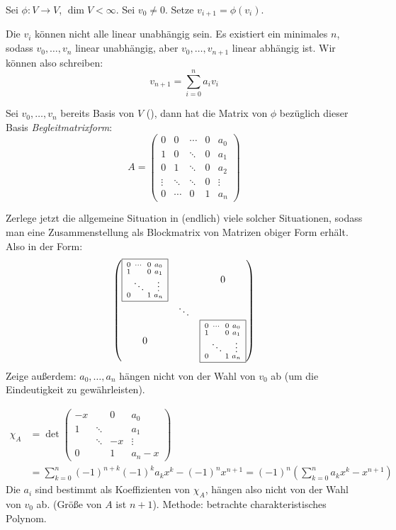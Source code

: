 \documentclass[a4paper, 10pt]{scrbook}
\begin{document}
\begin{ex}
Sei $\phi:V\to V$, $\dim V<\infty$.
Sei $v_0\neq 0$.
Setze $v_{i+1}=\phi(v_i)$.

Die $v_i$ können nicht alle linear unabhängig sein.
Es existiert ein minimales $n$, sodass $v_0,\dotsc,v_n$ linear unabhängig, aber $v_0,\dotsc,v_{n+1}$ linear abhängig ist.
Wir können also schreiben:
\[
v_{n+1} = \sum_{i=0}^n a_iv_i
\]

Sei $v_0,\dotsc,v_n$ bereits Basis von $V$ (\fixme[Verwirrend, denn $\dim V=n+1$]), dann hat die Matrix von $\phi$ bezüglich dieser Basis \emph{Begleitmatrixform}:
\[
A= \begin{pmatrix}
0 & 0 & \cdots & 0 & a_0\\
1 & 0 & \ddots & 0 & a_1\\
0 & 1 & \ddots & 0 & a_2\\
\vdots & \ddots & \ddots & 0 & \vdots\\
0 & \cdots & 0 & 1 & a_n
\end{pmatrix}
\]

Zerlege jetzt die allgemeine Situation in (endlich) viele solcher Situationen, sodass man eine Zusammenstellung als Blockmatrix von Matrizen obiger Form erhält. Also in der Form:
\[
\begin{pmatrix}
  \fbox{$\begin{smallmatrix} 0 & \cdots  & 0 & a_0 \\ 1 &  & 0 & a_1 \\ & \ddots &  & \vdots \\ 0 &  & 1 & a_n  \end {smallmatrix}$}  &  & 0 \\
 & \ddots &  \\
0 &  & \fbox{$\begin{smallmatrix} 0 & \cdots  & 0 & a_0 \\ 1 &  & 0 & a_1 \\ & \ddots &  & \vdots \\ 0 &  & 1 & a_n  \end {smallmatrix}$}
\end{pmatrix}
\]
Zeige außerdem: $a_0,\dotsc,a_n$ hängen nicht von der Wahl von $v_0$ ab (um die Eindeutigkeit zu gewährleisten).


\begin{align*}
\chi_A &= \det \begin{pmatrix} -x &   & 0 & a_0 \\ 1 & \ddots  &  & a_1 \\ & \ddots & -x  & \vdots \\ 0 &  & 1 & a_n-x  \end {pmatrix} \\  &=  \sum_{k=0}^{n} (-1)^{n+k} (-1)^ka_kx^k - (-1)^nx^{n+1}= (-1)^n \left (\sum_{k=0}^{n} a_kx^k - x^{n+1} \right )
\end{align*}
Die $a_i$ sind bestimmt als Koeffizienten von $\chi_A$, hängen also nicht von der Wahl von $v_0$ ab.
(Größe von $A$ ist $n+1$).
Methode:  betrachte charakteristisches Polynom.
\end{ex}
\end{document}
